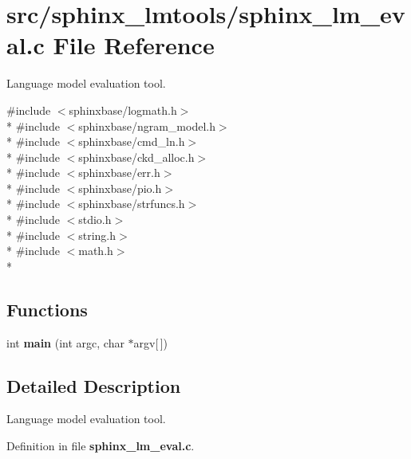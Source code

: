 \section{src/sphinx\-\_\-lmtools/sphinx\-\_\-lm\-\_\-eval.c File Reference}
\label{sphinx__lm__eval_8c}


Language model evaluation tool.  


{\ttfamily \#include $<$sphinxbase/logmath.\-h$>$}\\*
{\ttfamily \#include $<$sphinxbase/ngram\-\_\-model.\-h$>$}\\*
{\ttfamily \#include $<$sphinxbase/cmd\-\_\-ln.\-h$>$}\\*
{\ttfamily \#include $<$sphinxbase/ckd\-\_\-alloc.\-h$>$}\\*
{\ttfamily \#include $<$sphinxbase/err.\-h$>$}\\*
{\ttfamily \#include $<$sphinxbase/pio.\-h$>$}\\*
{\ttfamily \#include $<$sphinxbase/strfuncs.\-h$>$}\\*
{\ttfamily \#include $<$stdio.\-h$>$}\\*
{\ttfamily \#include $<$string.\-h$>$}\\*
{\ttfamily \#include $<$math.\-h$>$}\\*
\subsection*{Functions}
\begin{DoxyCompactItemize}
\item 
int {\bfseries main} (int argc, char $\ast$argv[$\,$])\label{sphinx__lm__eval_8c_a0ddf1224851353fc92bfbff6f499fa97}

\end{DoxyCompactItemize}


\subsection{Detailed Description}
Language model evaluation tool. 

Definition in file {\bf sphinx\-\_\-lm\-\_\-eval.\-c}.

